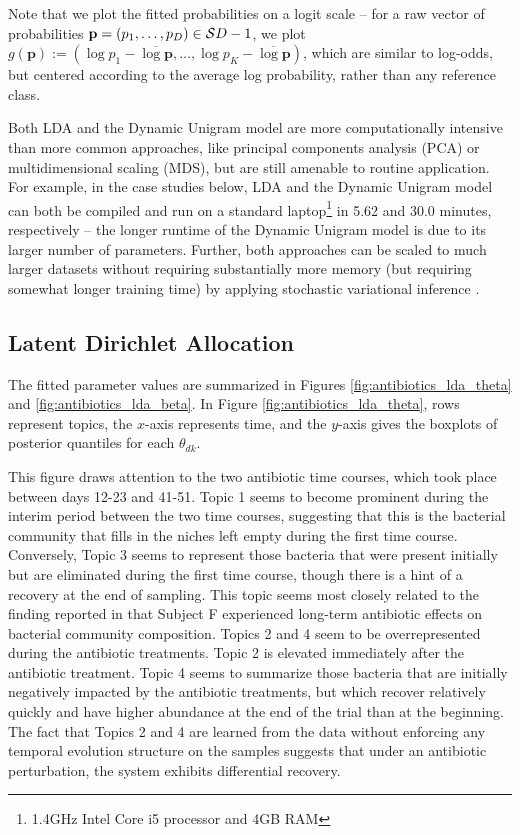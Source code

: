 \documentclass[oupdraft]{bio}
\begin{document}
Note that we plot the fitted probabilities on a logit scale -- for a raw vector
of probabilities $\mathbf{p} = \left(p_{1}, \dots, p_{D}\right) \in
\mathcal{S}{D - 1}$, we plot $g\left(\mathbf{p}\right) := \left(\log p_{1} -
\overline{\log \mathbf{p}}, \dots, \log p_{K} - \overline{\log
  \mathbf{p}}\right)$, which are similar to log-odds, but centered according to
the average log probability, rather than any reference class.

Both LDA and the Dynamic Unigram model are more computationally intensive than
more common approaches, like principal components analysis (PCA) or
multidimensional scaling (MDS), but are still amenable to routine application.
For example, in the case studies below, LDA and the Dynamic Unigram model can
both be compiled and run on a standard laptop\footnote{1.4GHz Intel Core i5
  processor and 4GB RAM} in 5.62 and 30.0 minutes, respectively -- the longer
runtime of the Dynamic Unigram model is due to its larger number of parameters.
Further, both approaches can be scaled to much larger datasets without requiring
substantially more memory (but requiring somewhat longer training time) by
applying stochastic variational inference \citep{hoffman2013stochastic,
  kucukelbir2015automatic}.

\subsection{Latent Dirichlet Allocation}
\label{sec:antibiotics_lda}

The fitted parameter values are summarized in Figures
\ref{fig:antibiotics_lda_theta} and \ref{fig:antibiotics_lda_beta}.
In Figure \ref{fig:antibiotics_lda_theta}, rows represent topics, the $x$-axis
represents time, and the $y$-axis gives the boxplots of posterior quantiles for
each $\theta_{dk}$.

This figure draws attention to the two antibiotic time courses, which took place
between days 12-23 and 41-51. Topic 1 seems to become prominent during the
interim period between the two time courses, suggesting that this is the
bacterial community that fills in the niches left empty during the first time
course. Conversely, Topic 3 seems to represent those bacteria that were present
initially but are eliminated during the first time course, though there is a
hint of a recovery at the end of sampling. This topic seems most closely related
to the finding reported in \cite{dethlefsen2011incomplete} that Subject F
experienced long-term antibiotic effects on bacterial community composition.
Topics 2 and 4 seem to be overrepresented during the antibiotic treatments.
Topic 2 is elevated immediately after the antibiotic treatment. Topic 4 seems to
summarize those bacteria that are initially negatively impacted by the
antibiotic treatments, but which recover relatively quickly and have higher
abundance at the end of the trial than at the beginning. The fact that Topics 2
and 4 are learned from the data without enforcing any temporal evolution
structure on the samples suggests that under an antibiotic perturbation, the
system exhibits differential recovery.
\end{document}
